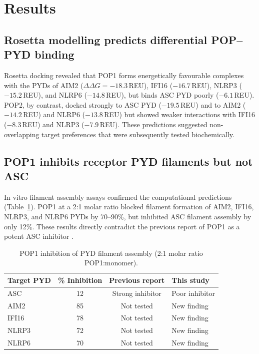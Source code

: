 \documentclass[12pt]{article}
\begin{document}
\section{Results}

\subsection{Rosetta modelling predicts differential POP--PYD binding}

Rosetta docking revealed that POP1 forms energetically favourable complexes with the PYDs of AIM2 ($\Delta\Delta G = -18.3$\,REU), IFI16 ($-16.7$\,REU), NLRP3 ($-15.2$\,REU), and NLRP6 ($-14.8$\,REU), but binds ASC PYD poorly ($-6.1$\,REU). POP2, by contrast, docked strongly to ASC PYD ($-19.5$\,REU) and to AIM2 ($-14.2$\,REU) and NLRP6 ($-13.8$\,REU) but showed weaker interactions with IFI16 ($-8.3$\,REU) and NLRP3 ($-7.9$\,REU). These predictions suggested non-overlapping target preferences that were subsequently tested biochemically.

\subsection{POP1 inhibits receptor PYD filaments but not ASC}

In vitro filament assembly assays confirmed the computational predictions (Table~\ref{tab:pop1}). POP1 at a 2:1 molar ratio blocked filament formation of AIM2, IFI16, NLRP3, and NLRP6 PYDs by 70--90\%, but inhibited ASC filament assembly by only 12\%. These results directly contradict the previous report of POP1 as a potent ASC inhibitor \citep{de2007pynod}.

\begin{table}[ht]
\centering
\caption{POP1 inhibition of PYD filament assembly (2:1 molar ratio POP1:monomer).}
\label{tab:pop1}
\begin{tabular}{lccl}
\toprule
Target PYD & \% Inhibition & Previous report & This study \\
\midrule
ASC & 12 & Strong inhibitor & Poor inhibitor \\
AIM2 & 85 & Not tested & New finding \\
IFI16 & 78 & Not tested & New finding \\
NLRP3 & 72 & Not tested & New finding \\
NLRP6 & 70 & Not tested & New finding \\
\bottomrule
\end{tabular}
\end{table}
\end{document}
